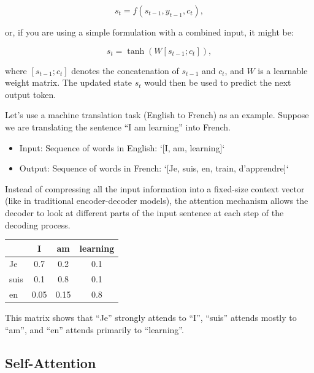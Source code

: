 \[
s_t = f(s_{t-1}, y_{t-1}, c_t),
\]

or, if you are using a simple formulation with a combined input, it might be:

\[
s_t = \tanh(W [s_{t-1}; c_t]),
\]

where \( [s_{t-1}; c_t] \) denotes the concatenation of \( s_{t-1} \) and \( c_t \), and \( W \) is a learnable weight matrix. The updated state \( s_t \) would then be used to predict the next output token.

Let's use a machine translation task (English to French) as an example. Suppose we are translating the sentence ``I am learning'' into French. 
\begin{itemize}
	\item Input: Sequence of words in English: `[I, am, learning]`
	\item Output: Sequence of words in French: `[Je, suis, en, train, d'apprendre]`
\end{itemize}

Instead of compressing all the input information into a fixed-size context vector (like in traditional encoder-decoder models), the attention mechanism allows the decoder to look at different parts of the input sentence at each step of the decoding process.

\begin{table}[h]
\centering
\begin{tabular}{lccc}
\toprule
& I & am & learning \\
\midrule
Je   & 0.7  & 0.2  & 0.1 \\
suis & 0.1  & 0.8  & 0.1 \\
en   & 0.05 & 0.15 & 0.8 \\
\bottomrule
\end{tabular}
\end{table}

This matrix shows that ``Je'' strongly attends to ``I'', ``suis'' attends mostly to ``am'', and ``en'' attends primarily to ``learning''.


\subsection{Self-Attention}

